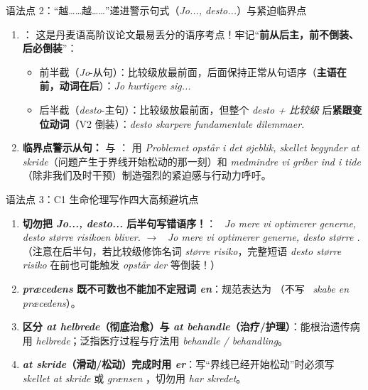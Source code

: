 \begin{grammatikbox}{语法点 2：“越……越……”递进警示句式（\textit{Jo..., desto...}）与紧迫临界点}
\begin{enumerate}
  \item \textbf{}：\newline
    这是丹麦语高阶议论文最易丢分的语序考点！牢记“\textbf{前从后主，前不倒装、后必倒装}”：
    \begin{itemize}
      \item 前半截（\textit{Jo}-从句）：比较级放最前面，后面保持正常从句语序（\textbf{主语在前，动词在后}）：\textit{Jo hurtigere  sig...}
      \item 后半截（\textit{desto}-主句）：比较级放最前面，但整个 \textit{desto + 比较级} 后\textbf{紧跟变位动词}（V2 倒装）：\textit{desto skarpere  fundamentale dilemmaer.}
    \end{itemize}
  \item \textbf{临界点警示从句：} 与 \textbf{}：\newline
    用 \textit{Problemet opstår i det øjeblik, skellet begynder at skride}（问题产生于界线开始松动的那一刻）和 \textit{medmindre vi griber ind i tide}（除非我们及时干预）制造强烈的紧迫感与行动力呼吁。
\end{enumerate}
\end{grammatikbox}

\begin{grammatikbox}{语法点 3：C1 生命伦理写作四大高频避坑点}
\begin{enumerate}
  \item \textbf{ 切勿把 \textit{Jo..., desto...} 后半句写错语序！}：\newline
    \ \textit{Jo mere vi optimerer generne, desto større risikoen bliver.} $\rightarrow$ \ \textit{Jo mere vi optimerer generne, desto større .}（注意在后半句，若比较级修饰名词 \textit{større risiko}，完整短语 \textit{desto større risiko} 在前也可能触发 \textit{opstår der} 等倒装！）
  \item \textbf{ \textit{præcedens} 既不可数也不能加不定冠词 \textit{en}}：规范表达为 （不写 \ \textit{skabe en præcedens}）。
  \item \textbf{ 区分 \textit{at helbrede}（彻底治愈）与 \textit{at behandle}（治疗/护理）}：能根治遗传病用 \textit{helbrede}；泛指医疗过程与疗法用 \textit{behandle / behandling}。
  \item \textbf{ \textit{at skride}（滑动/松动）完成时用 \textit{er}}：写“界线已经开始松动”时必须写 \textit{skellet  at skride} 或 \textit{grænsen }，切勿用 \textit{har skredet}。
\end{enumerate}
\end{grammatikbox}

